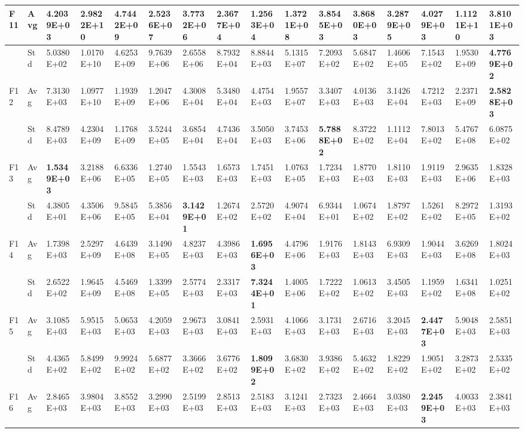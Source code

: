 \documentclass{article} %
\begin{document}
\begin{tabular}{|p{0.3in}|p{0.3in}|p{0.3in}|p{0.3in}|p{0.3in}|p{0.3in}|p{0.3in}|p{0.3in}|p{0.3in}|p{0.3in}|p{0.3in}|p{0.3in}|p{0.3in}|p{0.3in}|p{0.3in}|p{0.5in}|}
F11 & Avg & 4.2039E+03 & 2.9822E+10 & 4.7442E+09 & 2.5236E+07 & 3.7732E+06 & 2.3677E+04 & 1.2563E+04 & 1.3721E+08 & 3.8545E+03 & 3.8680E+03 & 3.2879E+05 & 4.0279E+03 & 1.1121E+10 & \textbf{3.8101E+03} \\ \hline 
 & Std & 5.0380E+02 & 1.0170E+10 & 4.6253E+09 & 9.7639E+06 & 2.6558E+06 & 8.7932E+04 & 8.8844E+03 & 5.1315E+07 & 7.2093E+02 & 5.6847E+02 & 1.4606E+05 & 7.1543E+02 & 1.9530E+09 & \textbf{4.7769E+02} \\ \hline 
F12 & Avg & 7.3130E+03 & 1.0977E+10 & 1.1939E+09 & 1.2047E+06 & 4.3008E+04 & 5.3480E+04 & 4.4754E+03 & 1.9557E+07 & 3.3407E+03 & 4.0136E+03 & 3.1426E+04 & 4.7212E+03 & 2.2371E+09 & \textbf{2.5828E+03} \\ \hline 
 & Std & 8.4789E+03 & 4.2304E+09 & 1.1768E+09 & 3.5244E+05 & 3.6854E+04 & 4.7436E+04 & 3.5050E+03 & 3.7453E+06 & \textbf{5.7888E+02} & 8.3722E+02 & 1.1112E+04 & 7.8013E+02 & 5.4767E+08 & 6.0875E+02 \\ \hline 
F13 & Avg & \textbf{1.5349E+03} & 3.2188E+06 & 6.6336E+05 & 1.2740E+05 & 1.5543E+03 & 1.6573E+03 & 1.7451E+03 & 1.0763E+05 & 1.7234E+03 & 1.8770E+03 & 1.8110E+03 & 1.9119E+03 & 2.9635E+06 & 1.8328E+03 \\ \hline 
 & Std & 4.3805E+01 & 4.3506E+06 & 9.5845E+05 & 5.3856E+04 & \textbf{3.1429E+01} & 1.2674E+02 & 2.5720E+02 & 4.9074E+04 & 6.9344E+01 & 1.0674E+02 & 1.8797E+02 & 1.5261E+02 & 8.2972E+05 & 1.3193E+02 \\ \hline 
F14 & Avg & 1.7398E+03 & 2.5297E+09 & 4.6439E+08 & 3.1490E+05 & 4.8237E+03 & 4.3986E+03 & \textbf{1.6956E+03} & 4.4796E+06 & 1.9176E+03 & 1.8143E+03 & 6.9309E+03 & 1.9044E+03 & 3.6269E+08 & 1.8024E+03 \\ \hline 
 & Std & 2.6522E+02 & 1.9645E+09 & 4.5469E+08 & 1.3399E+05 & 2.5774E+03 & 2.3317E+03 & \textbf{7.3244E+01} & 1.4005E+06 & 1.7222E+02 & 1.0613E+02 & 3.4505E+03 & 1.1959E+02 & 1.6341E+08 & 1.0251E+02 \\ \hline 
F15 & Avg & 3.1085E+03 & 5.9515E+03 & 5.0653E+03 & 4.2059E+03 & 2.9673E+03 & 3.0841E+03 & 2.5931E+03 & 4.1066E+03 & 3.1731E+03 & 2.6716E+03 & 3.2045E+03 & \textbf{2.4477E+03} & 5.9048E+03 & 2.5851E+03 \\ \hline 
 & Std & 4.4365E+02 & 5.8499E+02 & 9.9924E+02 & 5.6877E+02 & 3.3666E+02 & 3.6776E+02 & \textbf{1.8099E+02} & 3.6830E+02 & 3.9386E+02 & 5.4632E+02 & 1.8229E+02 & 1.9051E+02 & 3.2873E+02 & 2.5335E+02 \\ \hline 
F16 & Avg & 2.8465E+03 & 3.9804E+03 & 3.8552E+03 & 3.2990E+03 & 2.5199E+03 & 2.8513E+03 & 2.5183E+03 & 3.1241E+03 & 2.7323E+03 & 2.4664E+03 & 3.0380E+03 & \textbf{2.2459E+03} & 4.0033E+03 & 2.3841E+03 \\ \hline 

\end{tabular}
\end{document}

